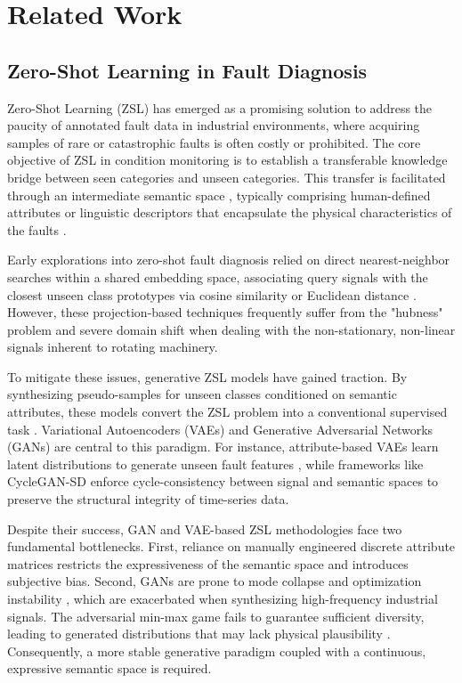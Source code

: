 \section{Related Work}

\subsection{Zero-Shot Learning in Fault Diagnosis}

Zero-Shot Learning (ZSL) has emerged as a promising solution to address the paucity of annotated fault data in industrial environments, where acquiring samples of rare or catastrophic faults is often costly or prohibited. The core objective of ZSL in condition monitoring is to establish a transferable knowledge bridge between seen categories and unseen categories. This transfer is facilitated through an intermediate semantic space \cite{mikolov2013efficient,oord2018representation}, typically comprising human-defined attributes or linguistic descriptors that encapsulate the physical characteristics of the faults \cite{zhang2022intelligent}.

Early explorations into zero-shot fault diagnosis relied on direct nearest-neighbor searches within a shared embedding space, associating query signals with the closest unseen class prototypes via cosine similarity or Euclidean distance \cite{tzeng2017adversarial}. However, these projection-based techniques frequently suffer from the "hubness" problem \cite{xian2019zero} and severe domain shift \cite{tzeng2017adversarial} when dealing with the non-stationary, non-linear signals \cite{li2024clip} inherent to rotating machinery.

To mitigate these issues, generative ZSL models \cite{xian2018feature} have gained traction. By synthesizing pseudo-samples for unseen classes conditioned on semantic attributes, these models convert the ZSL problem into a conventional supervised task \cite{liao2024cyclegan}. Variational Autoencoders (VAEs) \cite{lv2020hybrid} and Generative Adversarial Networks (GANs) are central to this paradigm. For instance, attribute-based VAEs learn latent distributions to generate unseen fault features \cite{wang2020deep}, while frameworks like CycleGAN-SD \cite{liao2024cyclegan,zhu2017unpaired} enforce cycle-consistency between signal and semantic \cite{radford2021learning} spaces to preserve the structural integrity of time-series data.

Despite their success, GAN and VAE-based ZSL methodologies face two fundamental bottlenecks. First, reliance on manually engineered discrete attribute matrices restricts the expressiveness of the semantic space and introduces subjective bias. Second, GANs are prone to mode collapse and optimization instability \cite{arjovsky2017wasserstein}, which are exacerbated when synthesizing high-frequency industrial signals. The adversarial min-max game fails to guarantee sufficient diversity, leading to generated distributions that may lack physical plausibility \cite{goodfellow2014generative}. Consequently, a more stable generative paradigm coupled with a continuous, expressive semantic space is required.

